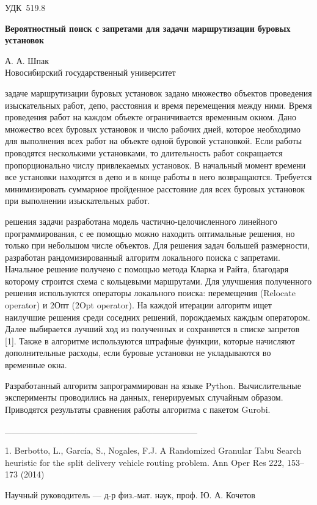 \documentclass[a5paper,10pt]{extreport}
\def\udcK#1{\noindent УДК~{#1}}
\def\titleK#1{\begin{center}{\textbf {#1}}\end{center}}
\def\authorK#1{\begin{center}{#1}\end{center}}
\def\advisorK#1{Научный руководитель — {#1}}
\newenvironment{bibliographyK}{\footnotesize \begin{enumerate}[label={[\arabic*]}]}{\end{enumerate}}
\theoremstyle{definition}
\theoremstyle{definition}
\theoremstyle{definition}
\begin{document}
	\udcK{519.8}
	\titleK{Вероятностный поиск с запретами для задачи маршрутизации буровых установок}
	\authorK{А. А. Шпак\\
		Новосибирский государственный университет}
	\parindent=0.5cm
	
	 задаче маршрутизации буровых установок задано множество объектов проведения изыскательных работ, депо, расстояния и время перемещения между ними. Время проведения работ на каждом объекте ограничивается временным окном. Дано множество всех буровых установок и число рабочих дней, которое необходимо для выполнения всех работ на объекте одной буровой установкой. Если работы проводятся несколькими установками, то длительность работ сокращается пропорционально числу привлекаемых установок. В начальный момент времени все установки находятся в депо и в конце работы в него возвращаются. Требуется минимизировать суммарное пройденное расстояние для всех буровых установок при выполнении изыскательных работ. 
	
	\parindent=0.5cm
	
	 решения задачи разработана модель частично-целочисленного линейного программирования, с ее помощью можно находить оптимальные решения, но только при небольшом числе объектов. Для решения задач большей размерности, разработан рандомизированный алгоритм локального поиска с запретами. Начальное решение получено с помощью метода Кларка и Райта, благодаря которому строится схема с кольцевыми маршрутами. Для улучшения полученного решения используются операторы локального поиска: перемещения (Relocate operator) и 2Опт (2Opt operator). На каждой итерации алгоритм ищет наилучшие решения среди соседних решений, порождаемых каждым оператором. Далее выбирается лучший ход из полученных и сохраняется в списке запретов [1]. Также в алгоритме используются штрафные функции, которые начисляют дополнительные расходы, если буровые установки не укладываются во временные окна.
	
	\parindent=0.5cm
	Разработанный алгоритм запрограммирован на языке Python. Вычислительные эксперименты проводились на данных, генерируемых случайным образом. Приводятся результаты сравнения работы алгоритма с пакетом Gurobi.
	
	\noindent\_\_\_\_\_\_\_\_\_\_\_\_\_\_\_\_\_\_\_\_\_\_\_\_\_\_\_\_\_\_
	\begin{bibliographyK}
		\item \label{reference1}
		1. Berbotto, L., García, S., Nogales, F.J. A Randomized Granular Tabu Search heuristic for the split delivery vehicle routing problem. Ann Oper Res 222, 153–173 (2014)
	\end{bibliographyK}
	\advisorK{д-р физ.-мат. наук, проф. Ю. А. Кочетов}
\end{document}
